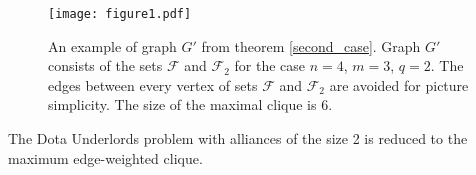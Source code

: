 \documentclass[smallextended]{svjour3}       %
\begin{document}
\begin{figure}[h!]
\begin{center}
\texttt{[image: figure1.pdf]}
\caption{An example of graph $G'$ from theorem \ref{second_case}.  Graph $G'$ consists of the sets $\mathcal{F}$ and $\mathcal{F}_2$ for the case $n=4$, $m=3$, $q=2$. The edges between every vertex of sets $\mathcal{F}$ and $\mathcal{F}_2$ are avoided for picture simplicity. The size of the maximal clique is 6. }
\label{fig:reduction}
\end{center}
\end{figure}

\begin{theorem}
\label{second_case}
    The Dota Underlords problem with alliances of the size 2 is reduced to the maximum edge-weighted clique.
\end{theorem}
\end{document}

